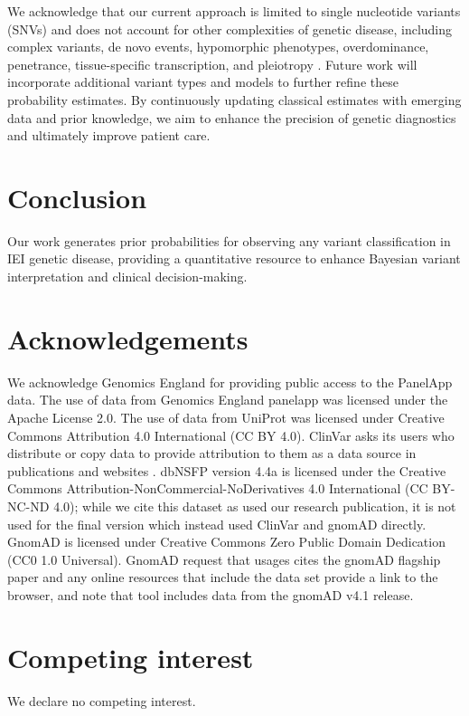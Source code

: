 We acknowledge that our current approach is limited to single nucleotide variants (SNVs) and does not account for other complexities of genetic disease, including complex variants, de novo events, hypomorphic phenotypes, overdominance, penetrance, tissue-specific transcription, and pleiotropy \cite{zschocke_mendelian_2023}. Future work will incorporate additional variant types and models to further refine these probability estimates. By continuously updating classical estimates with emerging data and prior knowledge, we aim to enhance the precision of genetic diagnostics and ultimately improve patient care.

\section{Conclusion}
Our work generates prior probabilities for observing any variant classification in IEI genetic disease, providing a quantitative resource to enhance Bayesian variant interpretation and clinical decision-making.

\section*{Acknowledgements}
\noindent
We acknowledge Genomics England for providing public access to the PanelApp data.
The use of data from Genomics England panelapp was licensed under the Apache License 2.0.
The use of data from UniProt was licensed under Creative Commons Attribution 4.0 International (CC BY 4.0).
ClinVar asks its users who distribute or copy data to provide attribution to them as a data source in publications and websites \cite{landrum_clinvar_2018}.
dbNSFP version 4.4a is licensed under the Creative Commons Attribution-NonCommercial-NoDerivatives 4.0 International (CC BY-NC-ND 4.0); while we cite this dataset as used our research publication, it is not used for the final version which instead used ClinVar and gnomAD directly.
GnomAD is licensed under  Creative Commons  Zero Public Domain Dedication (CC0 1.0 Universal).
GnomAD request that usages cites the gnomAD flagship paper \cite{karczewski2020mutational}
and any online resources that include the data set provide a link to the browser, and note that tool includes data from the gnomAD v4.1 release.

\section*{Competing interest}
\noindent
We declare no competing interest. 

